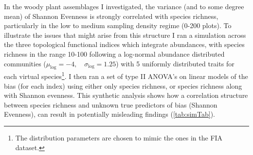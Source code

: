 \documentclass[
  10pt,
]{article}
\begin{document}
In the woody plant assemblages I investigated, the variance (and to some degree mean) of Shannon Evenness is strongly correlated with species richness, particularly in the low to medium sampling density regime (0-200 plots). To illustrate the issues that might arise from this structure I ran a simulation across the three topological functional indices which integrate abundances, with species richness in the range 10-100 following a log-normal abundance distributed communities (\(\mu_{\log}=-4,\quad\sigma_{\log}=1.25\)) with 5 uniformly distributed traits for each virtual species\footnote{The distribution parameters are chosen to mimic the ones in the FIA dataset.}. I then ran a set of type II ANOVA's on linear models of the bias (for each index) using either only species richness, or species richness along with Shannon evenness. This synthetic analysis shows how a correlation structure between species richness and unknown true predictors of bias (Shannon Evenness), can result in potentially misleading findings (\autoref{tab:simTab}).
\end{document}
